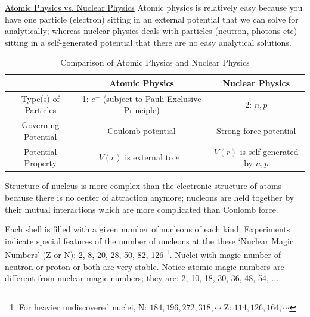\documentclass{school-22.101-notes}
\begin{document}
\uline{Atomic Physics vs. Nuclear Physics}
Atomic physics is relatively easy because you have one particle (electron) sitting in an external potential that we can solve for analytically; whereas nuclear physics deals with particles (neutron, photons etc) sitting in a self-generated potential that there are no easy analytical solutions. 
\begin{table}[h!]
    \centering
    \begin{tabular}{|c|c|c|} \hline
    & Atomic Physics & Nuclear Physics \\ \hline
    Type(s) of Particles &   1: $e^-$ (subject to Pauli Exclusive Principle) & 2: $n, p$ \\ \hline
    Governing Potential & Coulomb potential & Strong force potential \\ \hline
    Potential Property & $V(r)$ is external to $e^-$ & $V(r)$ is self-generated by $n,p$ \\ \hline
    \end{tabular}
    \caption{Comparison of Atomic Physics and Nuclear Physics}
\end{table}

Structure of nucleus is more complex than the electronic structure of atoms because there is no center of attraction anymore; nucleons are held together by their mutual interactions which are more complicated than Coulomb force. 

Each shell is filled with a given number of nucleons of each kind. Experiments indicate special features of the number of nucleons at the these `Nuclear Magic Numbers' (Z or N): 2, 8, 20, 28, 50, 82, 126 \footnote{For heavier undiscovered nuclei, N: $184, 196, 272, 318, \cdots$ Z: $114, 126, 164, \cdots$}. Nuclei with magic number of neutron or proton or both are very stable. Notice atomic magic numbers are different from nuclear magic numbers; they are: 2, 10, 18, 30, 36, 48, 54, ...
\end{document}
